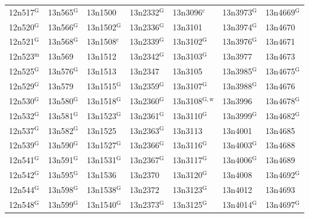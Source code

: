 \documentclass[12pt, oneside]{amsart}
\begin{document}
{\begin{longtable}{*{7}{>{\raggedright\arraybackslash}p{}}}
12n517$^{\mathrm{G}}$ & 13n565$^{\mathrm{G}}$ & 13n1500 & 13n2332$^{\mathrm{G}}$ & 13n3096$^{\mathrm{c}}$ & 13n3973$^{\mathrm{G}}$ & 13n4669$^{\mathrm{G}}$ \\
12n520$^{\mathrm{G}}$ & 13n566$^{\mathrm{G}}$ & 13n1502$^{\mathrm{G}}$ & 13n2336$^{\mathrm{G}}$ & 13n3101 & 13n3974$^{\mathrm{G}}$ & 13n4670 \\
12n521$^{\mathrm{G}}$ & 13n568$^{\mathrm{G}}$ & 13n1508$^{\mathrm{c}}$ & 13n2339$^{\mathrm{G}}$ & 13n3102$^{\mathrm{G}}$ & 13n3976$^{\mathrm{G}}$ & 13n4671 \\
12n523$^{\mathrm{m}}$ & 13n569 & 13n1512 & 13n2342$^{\mathrm{G}}$ & 13n3103$^{\mathrm{G}}$ & 13n3977 & 13n4673 \\
12n525$^{\mathrm{G}}$ & 13n576$^{\mathrm{G}}$ & 13n1513 & 13n2347 & 13n3105 & 13n3985$^{\mathrm{G}}$ & 13n4675$^{\mathrm{G}}$ \\
12n529$^{\mathrm{G}}$ & 13n579 & 13n1515$^{\mathrm{G}}$ & 13n2359$^{\mathrm{G}}$ & 13n3107$^{\mathrm{G}}$ & 13n3988$^{\mathrm{G}}$ & 13n4676 \\
12n530$^{\mathrm{G}}$ & 13n580$^{\mathrm{G}}$ & 13n1518$^{\mathrm{G}}$ & 13n2360$^{\mathrm{G}}$ & 13n3108$^{\mathrm{G,w}}$ & 13n3996 & 13n4678$^{\mathrm{G}}$ \\
12n532$^{\mathrm{G}}$ & 13n581$^{\mathrm{G}}$ & 13n1523$^{\mathrm{G}}$ & 13n2361$^{\mathrm{G}}$ & 13n3110$^{\mathrm{G}}$ & 13n3999$^{\mathrm{G}}$ & 13n4682$^{\mathrm{G}}$ \\
12n537$^{\mathrm{G}}$ & 13n582$^{\mathrm{G}}$ & 13n1525 & 13n2363$^{\mathrm{G}}$ & 13n3113 & 13n4001 & 13n4685 \\
12n539$^{\mathrm{G}}$ & 13n590$^{\mathrm{G}}$ & 13n1527$^{\mathrm{G}}$ & 13n2366$^{\mathrm{G}}$ & 13n3116$^{\mathrm{G}}$ & 13n4003$^{\mathrm{G}}$ & 13n4688 \\
12n541$^{\mathrm{G}}$ & 13n591$^{\mathrm{G}}$ & 13n1531$^{\mathrm{G}}$ & 13n2367$^{\mathrm{G}}$ & 13n3117$^{\mathrm{G}}$ & 13n4006$^{\mathrm{G}}$ & 13n4689 \\
12n542$^{\mathrm{G}}$ & 13n595$^{\mathrm{G}}$ & 13n1536 & 13n2370 & 13n3120$^{\mathrm{G}}$ & 13n4008 & 13n4692$^{\mathrm{G}}$ \\
12n544$^{\mathrm{G}}$ & 13n598$^{\mathrm{G}}$ & 13n1538$^{\mathrm{G}}$ & 13n2372 & 13n3123$^{\mathrm{G}}$ & 13n4012 & 13n4693 \\
12n548$^{\mathrm{G}}$ & 13n599$^{\mathrm{G}}$ & 13n1540$^{\mathrm{G}}$ & 13n2373$^{\mathrm{G}}$ & 13n3125$^{\mathrm{G}}$ & 13n4014$^{\mathrm{G}}$ & 13n4697$^{\mathrm{G}}$ \\

\end{longtable}}
\end{document}
